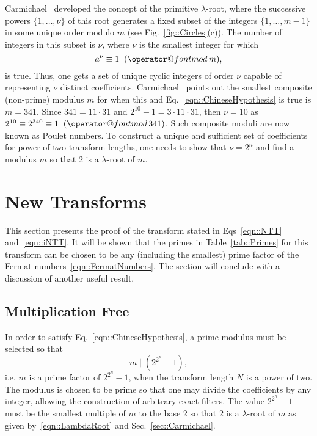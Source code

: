 \documentclass[twocolumn]{IEEEtran}
\makeatletter
\def\imod#1{\allowbreak\mkern10mu({\operator@font mod}\,#1)}
\newcommand{\modulusSymbol}{m}
\newcommand{\eqnTag}{Eq.}
\newcommand{\eqnsTag}{Eqs}
\newcommand{\figTag}{Fig.}
\newcommand{\tabTag}{Table}
\newcommand{\secTag}{Sec.}
\makeatother
\begin{document}
Carmichael~\citep{Carmichael1910} developed the concept of the primitive $\lambda$-root, where the successive powers $\{1,\ldots,\nu\}$ of this root generates a fixed subset of the integers $\{1,\ldots,\modulusSymbol-1\}$ in some unique order modulo $\modulusSymbol$ (see \figTag~\ref{fig::Circles}(c)). The number of integers in this subset is $\nu$, where $\nu$ is the smallest integer for which
\begin{equation}\label{eqn::LambdaRoot}
 a^{\nu} \equiv 1 \imod \modulusSymbol,
\end{equation}
is true. Thus, one gets a set of unique cyclic integers of order $\nu$ capable of representing $\nu$ distinct coefficients. Carmichael~\citep{Carmichael1910} points out the smallest composite (non-prime) modulus $\modulusSymbol$ for when this and \eqnTag~\eqref{eqn::ChineseHypothesis} is true is $\modulusSymbol=341$. Since $341= 11\cdot 31$ and $2^{10}-1 = 3 \cdot 11 \cdot 31$, then $\nu = 10$ as $ 2^{10} \equiv 2^{340} \equiv 1 \imod {341}$. Such composite moduli are now known as Poulet numbers. To construct a unique and sufficient set of coefficients for power of two transform lengths, one needs to show that $\nu = 2^n$ and find a modulus $\modulusSymbol$ so that 2 is a $\lambda$-root of $\modulusSymbol$.

\section{New Transforms}\label{sec::Transforms}
This section presents the proof of the transform stated in \eqnsTag~\eqref{eqn::NTT} and~\eqref{eqn::iNTT}. It will be shown that the primes in \tabTag~\ref{tab::Primes} for this transform can be chosen to be any (including the smallest) prime factor of the Fermat numbers~\eqref{eqn::FermatNumbers}. The section will conclude with a discussion of another useful result.

\subsection{Multiplication Free}
In order to satisfy \eqnTag~\eqref{eqn::ChineseHypothesis}, a prime modulus must be selected so that
\begin{equation}
 \modulusSymbol \mid ( 2^{2^n} - 1 ),
\end{equation}
i.e. $\modulusSymbol$ is a prime factor of $2^{2^n} - 1$, when the transform length $N$ is a power of two. The modulus is chosen to be prime so that one may divide the coefficients by any integer, allowing the construction of arbitrary exact filters. The value $2^{2^n} - 1$ must be the smallest multiple of $\modulusSymbol$ to the base 2 so that 2 is a $\lambda$-root of $\modulusSymbol$ as given by~\eqref{eqn::LambdaRoot} and \secTag~\ref{sec::Carmichael}.
\end{document}
